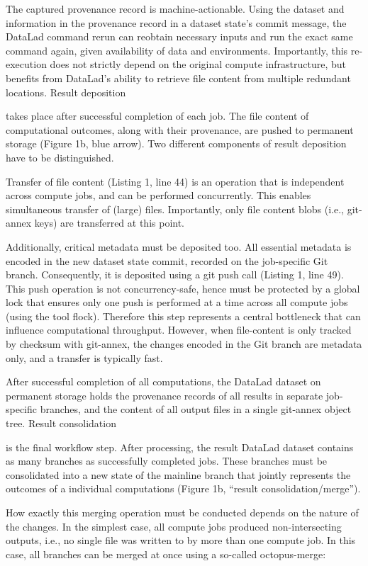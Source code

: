 The captured provenance record is machine-actionable. Using the dataset and information in the provenance record in a dataset state’s commit message, the DataLad command rerun can reobtain necessary inputs and run the exact same command again, given availability of data and environments. Importantly, this re-execution does not strictly depend on the original compute infrastructure, but benefits from DataLad’s ability to retrieve file content from multiple redundant locations.
Result deposition

takes place after successful completion of each job. The file content of computational outcomes, along with their provenance, are pushed to permanent storage (Figure 1b, blue arrow). Two different components of result deposition have to be distinguished.

Transfer of file content (Listing 1, line 44) is an operation that is independent across compute jobs, and can be performed concurrently. This enables simultaneous transfer of (large) files. Importantly, only file content blobs (i.e., git-annex keys) are transferred at this point.

Additionally, critical metadata must be deposited too. All essential metadata is encoded in the new dataset state commit, recorded on the job-specific Git branch. Consequently, it is deposited using a git push call (Listing 1, line 49). This push operation is not concurrency-safe, hence must be protected by a global lock that ensures only one push is performed at a time across all compute jobs (using the tool flock). Therefore this step represents a central bottleneck that can influence computational throughput. However, when file-content is only tracked by checksum with git-annex, the changes encoded in the Git branch are metadata only, and a transfer is typically fast.

After successful completion of all computations, the DataLad dataset on permanent storage holds the provenance records of all results in separate job-specific branches, and the content of all output files in a single git-annex object tree.
Result consolidation

is the final workflow step. After processing, the result DataLad dataset contains as many branches as successfully completed jobs. These branches must be consolidated into a new state of the mainline branch that jointly represents the outcomes of a individual computations (Figure 1b, “result consolidation/merge”).

How exactly this merging operation must be conducted depends on the nature of the changes. In the simplest case, all compute jobs produced non-intersecting outputs, i.e., no single file was written to by more than one compute job. In this case, all branches can be merged at once using a so-called octopus-merge:

